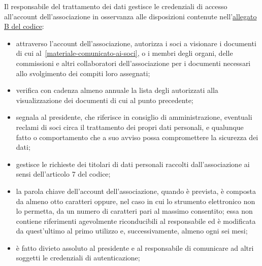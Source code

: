 Il responsabile del trattamento dei dati gestisce le credenziali di accesso
all'account dell'associazione in osservanza alle disposizioni
contenute
nell'\href{http://www.garanteprivacy.it/web/guest/home/docweb/-/docweb-display/docweb/1557184}{allegato
B del codice}:
\begin{itemize}
    \item attraverso l'account dell'associazione, autorizza i soci a
        visionare i documenti di cui al~\ref{materiale-comunicato-ai-soci},
        o i membri degli organi, delle commissioni e altri collaboratori
        dell'associazione per i documenti necessari allo svolgimento dei
        compiti loro assegnati;
    \item verifica con cadenza almeno annuale la lista degli 
        autorizzati alla visualizzazione dei documenti di cui al punto
        precedente;
    \item segnala al presidente, che riferisce in consiglio di
        amministrazione, eventuali reclami di soci circa il
        trattamento dei propri dati personali, e qualunque fatto o
        comportamento che a suo avviso possa compromettere la sicurezza dei
        dati;
    \item gestisce le richieste dei titolari di dati personali raccolti
        dall'associazione ai sensi dell'articolo 7 del codice;
    \item la parola chiave dell'account dell'associazione, quando è prevista,
        è composta da almeno otto caratteri oppure, nel caso in cui lo
        strumento elettronico non lo permetta, da un numero di caratteri
        pari al massimo consentito; essa non contiene riferimenti
        agevolmente riconducibili al responsabile ed è modificata da
        quest'ultimo al primo utilizzo e, successivamente, almeno ogni sei
        mesi;
    \item è fatto divieto assoluto al presidente e al responsabile di
        comunicare ad altri soggetti le credenziali di autenticazione;
\end{itemize}
